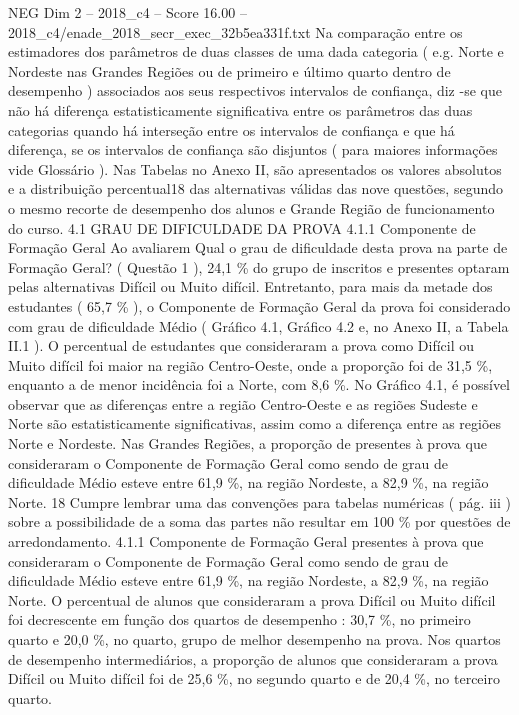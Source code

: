 \begin{textsample}{NEG Dim 2 – 2018\_c4 – Score 16.00 – 2018\_c4/enade\_2018\_secr\_exec\_32b5ea331f.txt}
Na comparação entre os estimadores dos parâmetros de duas classes de uma dada categoria ( e.g.
Norte e Nordeste nas Grandes Regiões ou de primeiro e último quarto dentro de desempenho ) associados aos seus respectivos intervalos de confiança, diz -se que não há diferença estatisticamente significativa entre os parâmetros das duas categorias quando há interseção entre os intervalos de confiança e que há diferença, se os intervalos de confiança são disjuntos ( para maiores informações vide Glossário ).
Nas Tabelas no Anexo II, são apresentados os valores absolutos e a distribuição percentual18 das alternativas válidas das nove questões, segundo o mesmo recorte de desempenho dos alunos e Grande Região de funcionamento do curso. 4.1 GRAU DE DIFICULDADE DA PROVA 4.1.1 Componente de Formação Geral Ao avaliarem Qual o grau de dificuldade desta prova na parte de Formação Geral? ( Questão 1 ), 24,1 \% do grupo de inscritos e presentes optaram pelas alternativas Difícil ou Muito difícil.
Entretanto, para mais da metade dos estudantes ( 65,7 \% ), o Componente de Formação Geral da prova foi considerado com grau de dificuldade Médio ( Gráfico 4.1, Gráfico 4.2 e, no Anexo II, a Tabela II.1 ).
O percentual de estudantes que consideraram a prova como Difícil ou Muito difícil foi maior na região Centro-Oeste, onde a proporção foi de 31,5 \%, enquanto a de menor incidência foi a Norte, com 8,6 \%.
No Gráfico 4.1, é possível observar que as diferenças entre a região Centro-Oeste e as regiões Sudeste e Norte são estatisticamente significativas, assim como a diferença entre as regiões Norte e Nordeste.
Nas Grandes Regiões, a proporção de presentes à prova que consideraram o Componente de Formação Geral como sendo de grau de dificuldade Médio esteve entre 61,9 \%, na região Nordeste, a 82,9 \%, na região Norte. 18 Cumpre lembrar uma das convenções para tabelas numéricas ( pág. iii ) sobre a possibilidade de a soma das partes não resultar em 100 \% por questões de arredondamento. 4.1.1 Componente de Formação Geral presentes à prova que consideraram o Componente de Formação Geral como sendo de grau de dificuldade Médio esteve entre 61,9 \%, na região Nordeste, a 82,9 \%, na região Norte.
O percentual de alunos que consideraram a prova Difícil ou Muito difícil foi decrescente em função dos quartos de desempenho : 30,7 \%, no primeiro quarto e 20,0 \%, no quarto, grupo de melhor desempenho na prova.
Nos quartos de desempenho intermediários, a proporção de alunos que consideraram a prova Difícil ou Muito difícil foi de 25,6 \%, no segundo quarto e de 20,4 \%, no terceiro quarto.

\end{textsample}
